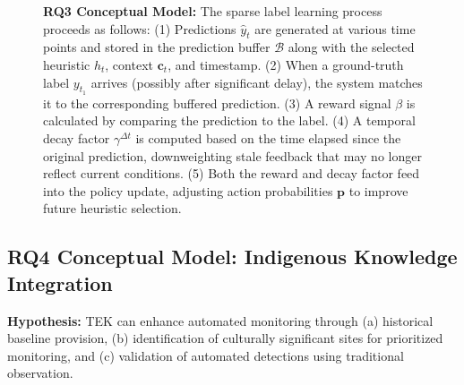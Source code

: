 \documentclass[12pt,oneside]{book}
\begin{document}
\begin{figure}[H]
    \caption{\textbf{RQ3 Conceptual Model:} The sparse label learning process proceeds as follows: (1) Predictions $\hat{y}_t$ are generated at various time points and stored in the prediction buffer $\mathcal{B}$ along with the selected heuristic $h_t$, context $\mathbf{c}_t$, and timestamp. (2) When a ground-truth label $y_{t_1}$ arrives (possibly after significant delay), the system matches it to the corresponding buffered prediction. (3) A reward signal $\beta$ is calculated by comparing the prediction to the label. (4) A temporal decay factor $\gamma^{\Delta t}$ is computed based on the time elapsed since the original prediction, downweighting stale feedback that may no longer reflect current conditions. (5) Both the reward and decay factor feed into the policy update, adjusting action probabilities $\mathbf{p}$ to improve future heuristic selection.}
    \label{fig:rq3-model}
\end{figure}

\subsection{RQ4 Conceptual Model: Indigenous Knowledge Integration}
\label{subsec:rq4-model}

\textbf{Hypothesis:} TEK can enhance automated monitoring through (a) historical baseline provision, (b) identification of culturally significant sites for prioritized monitoring, and (c) validation of automated detections using traditional observation.
\end{document}
